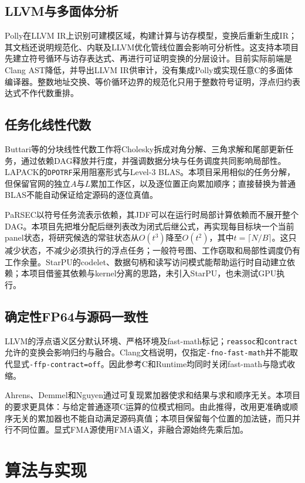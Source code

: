 \documentclass[UTF8,a4paper,11pt]{ctexart}
\begin{document}
\subsection{LLVM与多面体分析}
Polly在LLVM IR上识别可建模区域，构建计算与访存模型，变换后重新生成IR；其文档还说明规范化、内联及LLVM优化管线位置会影响可分析性\cite{polly}。这支持本项目先建立符号循环与访存表达式、再进行可证明变换的分层设计。目前实际前端是Clang AST降低，并导出LLVM IR供审计，没有集成Polly或实现任意C的多面体编译器。整数地址交换、等价循环边界的规范化只用于整数符号证明，浮点归约表达式不作代数重排。

\subsection{任务化线性代数}
Buttari等的分块线性代数工作将Cholesky拆成对角分解、三角求解和尾部更新任务，通过依赖DAG释放并行度，并强调数据分块与任务调度共同影响局部性\cite{buttari}。LAPACK的\texttt{DPOTRF}采用阻塞形式与Level-3 BLAS\cite{lapack}。本项目采用相似的任务分解，但保留官网的独立$A$与$L$累加工作区，以及逐位置正向累加顺序；直接替换为普通BLAS不能自动保证给定源码的逐位真值。

PaRSEC以符号任务流表示依赖，其JDF可以在运行时局部计算依赖而不展开整个DAG\cite{parsec}。本项目先把堆分配后继列表改为闭式后继公式，再实现每目标块一个当前panel状态，将研究候选的常驻状态从$O(t^3)$降至$O(t^2)$，其中$t=\lceil N/B\rceil$。这只减少状态，不减少必须执行的浮点任务；一般符号图、工作窃取和局部性调度仍有工作余量。StarPU的codelet、数据句柄和读写访问模式能帮助运行时自动建立依赖\cite{starpu}；本项目借鉴其依赖与kernel分离的思路，未引入StarPU，也未测试GPU执行。

\subsection{确定性FP64与源码一致性}
LLVM的浮点语义区分默认环境、严格环境及fast-math标记；\texttt{reassoc}和\texttt{contract}允许的变换会影响归约与融合\cite{llvmfp}。Clang文档说明，仅指定\texttt{-fno-fast-math}并不能取代显式\texttt{-ffp-contract=off}\cite{clangfp}。因此参考C和Runtime均同时关闭fast-math与隐式收缩。

Ahrens、Demmel和Nguyen通过可复现累加器使求和结果与求和顺序无关\cite{repro}。本项目的要求更具体：与给定普通逐项C运算的位模式相同。由此推得，改用更准确或顺序无关的累加器也不能自动满足源码真值；本项目保留每个位置的加法链，而只并行不同位置。显式FMA源使用FMA语义，非融合源始终先乘后加。

\section{算法与实现}
\end{document}
